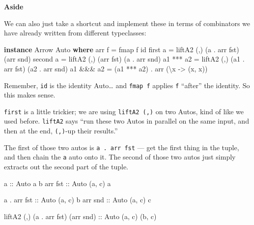 \documentclass[]{article}
\newenvironment{Shaded}{}{}
\newcommand{\DataTypeTok}[1]{\textcolor[rgb]{0.56,0.13,0.00}{#1}}
\newcommand{\FunctionTok}[1]{\textcolor[rgb]{0.02,0.16,0.49}{#1}}
\newcommand{\KeywordTok}[1]{\textcolor[rgb]{0.00,0.44,0.13}{\textbf{#1}}}
\newcommand{\NormalTok}[1]{#1}
\newcommand{\OperatorTok}[1]{\textcolor[rgb]{0.40,0.40,0.40}{#1}}
\newcommand{\OtherTok}[1]{\textcolor[rgb]{0.00,0.44,0.13}{#1}}
\begin{document}
\textbf{Aside}

We can also just take a shortcut and implement these in terms of combinators we
have already written from different typeclasses:

\begin{Shaded}
\begin{Highlighting}[]
\KeywordTok{instance} \DataTypeTok{Arrow} \DataTypeTok{Auto} \KeywordTok{where}
\NormalTok{    arr f     }\OtherTok{=} \FunctionTok{fmap}\NormalTok{ f }\FunctionTok{id}
\NormalTok{    first a   }\OtherTok{=}\NormalTok{ liftA2 (,) (a  }\OperatorTok{.}\NormalTok{ arr }\FunctionTok{fst}\NormalTok{) (arr }\FunctionTok{snd}\NormalTok{)}
\NormalTok{    second a  }\OtherTok{=}\NormalTok{ liftA2 (,) (arr }\FunctionTok{fst}\NormalTok{)      (a  }\OperatorTok{.}\NormalTok{ arr }\FunctionTok{snd}\NormalTok{)}
\NormalTok{    a1 }\OperatorTok{***}\NormalTok{ a2 }\OtherTok{=}\NormalTok{ liftA2 (,) (a1 }\OperatorTok{.}\NormalTok{ arr }\FunctionTok{fst}\NormalTok{) (a2 }\OperatorTok{.}\NormalTok{ arr }\FunctionTok{snd}\NormalTok{)}
\NormalTok{    a1 }\OperatorTok{\&\&\&}\NormalTok{ a2 }\OtherTok{=}\NormalTok{ (a1 }\OperatorTok{***}\NormalTok{ a2) }\OperatorTok{.}\NormalTok{ arr (\textbackslash{}x }\OtherTok{{-}>}\NormalTok{ (x, x))}
\end{Highlighting}
\end{Shaded}

Remember, \texttt{id} is the identity Auto\ldots{} and \texttt{fmap\ f} applies
\texttt{f} ``after'' the identity. So this makes sense.

\texttt{first} is a little trickier; we are using \texttt{liftA2\ (,)} on two
Autos, kind of like we used before. \texttt{liftA2} says ``run these two Autos
in parallel on the same input, and then at the end, \texttt{(,)}-up their
results.''

The first of those two autos is \texttt{a\ .\ arr\ fst} --- get the first thing
in the tuple, and then chain the \texttt{a} auto onto it. The second of those
two autos just simply extracts out the second part of the tuple.

\begin{Shaded}
\begin{Highlighting}[]
\OtherTok{a           ::} \DataTypeTok{Auto}\NormalTok{ a b}
\NormalTok{arr}\OtherTok{ fst     ::} \DataTypeTok{Auto}\NormalTok{ (a, c) a}

\NormalTok{a }\OperatorTok{.}\NormalTok{ arr}\OtherTok{ fst ::} \DataTypeTok{Auto}\NormalTok{ (a, c) b}
\NormalTok{arr}\OtherTok{ snd     ::} \DataTypeTok{Auto}\NormalTok{ (a, c) c}

\NormalTok{liftA2 (,) (a }\OperatorTok{.}\NormalTok{ arr }\FunctionTok{fst}\NormalTok{) (arr }\FunctionTok{snd}\NormalTok{)}\OtherTok{ ::} \DataTypeTok{Auto}\NormalTok{ (a, c) (b, c)}
\end{Highlighting}
\end{Shaded}
\end{document}
